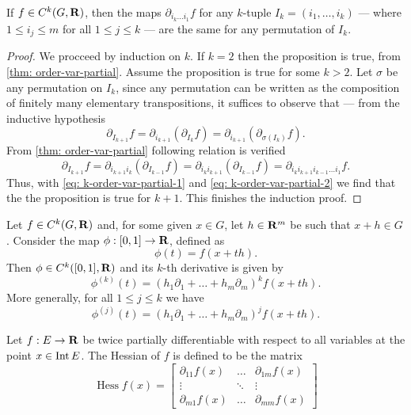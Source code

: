 \begin{corollary}\label{cor: k-order-var-partial}
  If \(f \in C^k(G, \mathbf{R})\), then the maps \(\partial_{i_k \dots i_1} f\) for any
  \(k\)-tuple \(I_k = (i_1, \dots, i_k)\) --- where \(1 \leq i_j \leq m\) for
  all \(1 \leq j \leq k\) --- are the same for any permutation of \(I_k\).
\end{corollary}

\begin{proof}
  We procceed by induction on \(k\). If \(k = 2\) then the proposition is true,
  from \cref{thm: order-var-partial}. Assume the proposition is true for some
  \(k > 2\). Let \(\sigma\) be any permutation on \(I_k\), since any permutation
  can be written as the composition of finitely many elementary transpositions,
  it suffices to observe that --- from the inductive hypothesis
  \begin{equation}\label{eq: k-order-var-partial-1}
    \partial_{I_{k+1}} f
    = \partial_{i_{k+1}} \left( \partial_{I_k} f \right)
    = \partial_{i_{k+1}} \left( \partial_{\sigma(I_k)} f \right).
  \end{equation}
  From \cref{thm: order-var-partial} following relation is verified
  \begin{equation}\label{eq: k-order-var-partial-2}
    \partial_{I_{k+1}} f
    = \partial_{i_{k+1} i_k} \left( \partial_{I_{k-1}} f \right)
    = \partial_{i_k i_{k+1}} \left( \partial_{I_{k-1}} f \right)
    = \partial_{i_k i_{k+1} i_{k-1} \dots i_1} f.
  \end{equation}
  Thus, with \cref{eq: k-order-var-partial-1} and \cref{eq:
  k-order-var-partial-2} we find that the the proposition is true for \(k + 1\).
  This finishes the induction proof.
\end{proof}

\begin{example}\label{ex: taylor-auxiliar}
  Let \(f \in C^k(G, \mathbf{R})\) and, for some given \(x \in G\), let \(h \in \mathbf{R}^m\) be
  such that \(x + h \in G\). Consider the map \(\phi: [0, 1] \to \mathbf{R}\), defined as
  \[
    \phi(t) = f(x + th).
  \]
  Then \(\phi \in C^k([0, 1], \mathbf{R})\) and its \(k\)-th derivative is given by
  \[
    \phi^{(k)}(t) = (h_1 \partial_1 + \dots + h_m \partial_m)^k f(x + th).
  \]
  More generally, for all \(1 \leq j \leq k\) we have
  \[
    \phi^{(j)}(t) = (h_1 \partial_1 + \dots + h_m \partial_m)^j f(x + th).
  \]
\end{example}

\begin{definition}
  Let \(f: E \to \mathbf{R}\) be twice partially differentiable with respect to all
  variables at the point \(x \in \operatorname{Int} E\). The Hessian of \(f\) is defined to be
  the matrix
  \[
    \operatorname{Hess} f(x) =
    \begin{bmatrix}
      \partial_{1 1} f(x) &\dots &\partial_{1 m} f(x) \\
      \vdots &\ddots &\vdots \\
      \partial_{m 1} f(x) &\dots &\partial_{m m} f(x)
    \end{bmatrix}
  \]
\end{definition}

